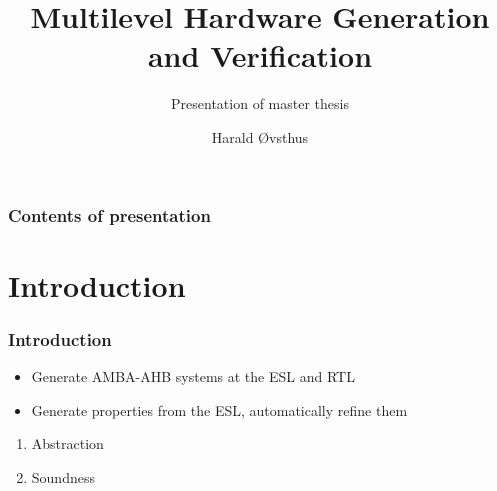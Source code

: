 \documentclass[]{beamer}
\title{Multilevel Hardware Generation and Verification}
\subtitle{Presentation of master thesis}
\author{Harald Øvsthus}
\begin{document}
	\begin{frame}[plain]

		\titlepage
	\end{frame}

	\begin{frame}
		\frametitle{Contents of presentation}
		\tableofcontents
	\end{frame}

	\section{Introduction}
	\begin{frame}
		\frametitle{Introduction}
	          \onslide<1->{\textbf{Idea:}}
                  \begin{itemize}
	           \item<1->Generate AMBA-AHB systems at the ESL and RTL
                   \item<1->Generate properties from the ESL, automatically refine them
                  \end{itemize}
                    \begin{enumerate}
                      \item<2-> Abstraction
                      \item<2-> Soundness
                    \end{enumerate}     
	\end{frame}
\end{document}
